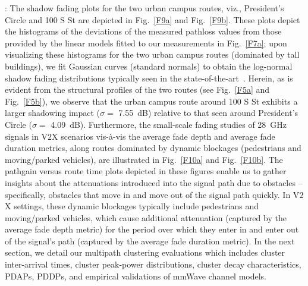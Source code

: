 \documentclass[12pt, draftcls, onecolumn]{IEEEtran}
\begin{document}
{: The shadow fading plots for the two urban campus routes, viz., President's Circle and 100 S St are depicted in Fig.~\ref{F9a} and Fig.~\ref{F9b}. These plots depict the histograms of the deviations of the measured pathloss values from those provided by the linear models fitted to our measurements in Fig.~\ref{F7a}; upon visualizing these histograms for the two urban campus routes (dominated by tall buildings), we fit Gaussian curves (standard normals) to obtain the log-normal shadow fading distributions typically seen in the state-of-the-art~\cite{DopplerHST}. Herein, as is evident from the structural profiles of the two routes (see Fig.~\ref{F5a} and Fig.~\ref{F5b}), we observe that the urban campus route around 100 S St exhibits a larger shadowing impact ($\sigma = $ \SI{7.55}{\deci\bel}) relative to that seen around President's Circle ($\sigma = $ \SI{4.09}{\deci\bel}). Furthermore, the small-scale fading studies of \SI{28}{\giga\hertz} signals in V$2$X scenarios vis-à-vis the average fade depth and average fade duration metrics, along routes dominated by dynamic blockages (pedestrians and moving/parked vehicles), are illustrated in Fig.~\ref{F10a} and Fig.~\ref{F10b}. The pathgain versus route time plots depicted in these figures enable us to gather insights about the attenuations introduced into the signal path due to obstacles -- specifically, obstacles that move in and move out of the signal path quickly. In V$2$X settings, these dynamic blockages typically include pedestrians and moving/parked vehicles, which cause additional attenuation (captured by the average fade depth metric) for the period over which they enter in and enter out of the signal's path (captured by the average fade duration metric). In the next section, we detail our multipath clustering evaluations which includes cluster inter-arrival times, cluster peak-power distributions, cluster decay characteristics, PDAPs, PDDPs, and empirical validations of mmWave channel models.
\begin{figure} [t]
     \centering
     \begin{subfigure}{0.482\linewidth}
         \centering

\end{subfigure}
\end{figure}}
\end{document}
